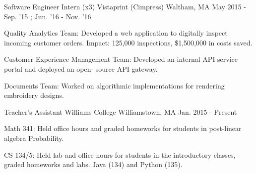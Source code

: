 \begin{cventries}
  \cventry
    {Software Engineer Intern (x3)} %
    {Vistaprint (Cimpress)} %
    {Waltham, MA} %
    {May 2015 - Sep. '15 ; Jun. '16 - Nov. '16} %
    {
      \begin{cvitems} %
        \item {Quality Analytics Team: Developed a web application to digitally inspect incoming customer orders. Impact: 125,000 inspections, \$1,500,000 in costs saved.}
        \item {Customer Experience Management Team: Developed an internal API service portal and deployed an open- source API gateway.}
        \item {Documents Team: Worked on algorithmic implementations for rendering embroidery designs.}
      \end{cvitems}
    }

  \cventry
    {Teacher's Assistant} %
    {Williams College} %
    {Williamstown, MA} %
    {Jan. 2015 - Present} %
    {
      \begin{cvitems} %
        \item {Math 341: Held office hours and graded homeworks for students in post-linear algebra Probability.}
        \item {CS 134/5: Held lab and office hours for students in the introductory classes, graded homeworks and labs. Java (134) and Python (135).}
      \end{cvitems}
    }

\end{cventries}
